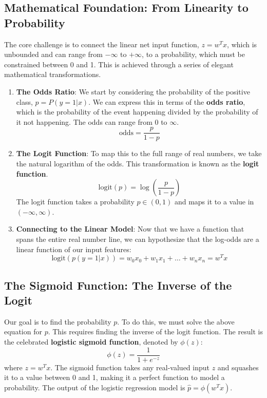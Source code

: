 \subsection*{Mathematical Foundation: From Linearity to Probability}
The core challenge is to connect the linear net input function, $z = w^T x$, which is unbounded and can range from $-\infty$ to $+\infty$, to a probability, which must be constrained between 0 and 1. This is achieved through a series of elegant mathematical transformations.

\begin{enumerate}
    \item \textbf{The Odds Ratio}: We start by considering the probability of the positive class, $p = P(y=1|x)$. We can express this in terms of the \textbf{odds ratio}, which is the probability of the event happening divided by the probability of it not happening. The odds can range from 0 to $\infty$.
    $$ \text{odds} = \frac{p}{1-p} $$
    \item \textbf{The Logit Function}: To map this to the full range of real numbers, we take the natural logarithm of the odds. This transformation is known as the \textbf{logit function}.
    $$ \text{logit}(p) = \log\left(\frac{p}{1-p}\right) $$
    The logit function takes a probability $p \in (0, 1)$ and maps it to a value in $(-\infty, \infty)$.
    \item \textbf{Connecting to the Linear Model}: Now that we have a function that spans the entire real number line, we can hypothesize that the log-odds are a linear function of our input features:
    $$ \text{logit}(p(y=1|x)) = w_0 x_0 + w_1 x_1 + \dots + w_n x_n = w^T x $$
\end{enumerate}

\subsection*{The Sigmoid Function: The Inverse of the Logit}
Our goal is to find the probability $p$. To do this, we must solve the above equation for $p$. This requires finding the inverse of the logit function. The result is the celebrated \textbf{logistic sigmoid function}, denoted by $\phi(z)$:
$$ \phi(z) = \frac{1}{1 + e^{-z}} $$
where $z = w^T x$. The sigmoid function takes any real-valued input $z$ and squashes it to a value between 0 and 1, making it a perfect function to model a probability. The output of the logistic regression model is $\hat{p} = \phi(w^T x)$.

